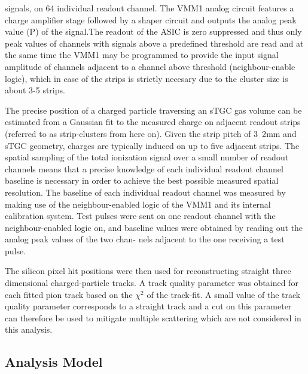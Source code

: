 signals, on 64 individual readout channel. The VMM1 analog circuit features a charge amplifier stage followed by a
shaper circuit and outputs the analog peak value (P) of the signal.The readout of the ASIC is zero suppressed and thus
only peak values of channels with signals above a predefined threshold are read and at the same time the VMM1 may be
programmed to provide the input signal amplitude of channels adjacent to a channel above threshold (neighbour-enable
logic), which in case of the strips is strictly necesary due to the cluster size is about 3-5 strips.\par
The precise position of a charged particle traversing an sTGC gas volume can be estimated from a Gaussian fit to the
measured charge on adjacent readout strips (referred to as strip-clusters from here on). Given the strip pitch of
\unit{3.2}{mm}
and sTGC geometry, charges are typically induced on up to five adjacent strips. The spatial sampling of the total
ionization signal over a small number of readout channels means that a precise knowledge of each individual readout
channel baseline is necessary in order to achieve the best possible measured spatial resolution. The baseline of each
individual readout channel was measured by making use of the neighbour-enabled logic of the VMM1 and its internal
calibration system. Test pulses were sent on one readout channel with the neighbour-enabled logic on, and baseline
values were obtained by reading out the analog peak values of the two chan- nels adjacent to the one receiving a test
pulse.\par
The silicon pixel hit positions were then used for reconstructing straight three dimensional charged-particle tracks. A
track quality parameter was obtained for each fitted pion track based on the $\chi^2$ of the track-fit. A small value of the track quality parameter corresponds to a straight track and a cut on this parameter can therefore be used to mitigate
multiple scattering which are not considered in this analysis.
\subsection{Analysis Model}
